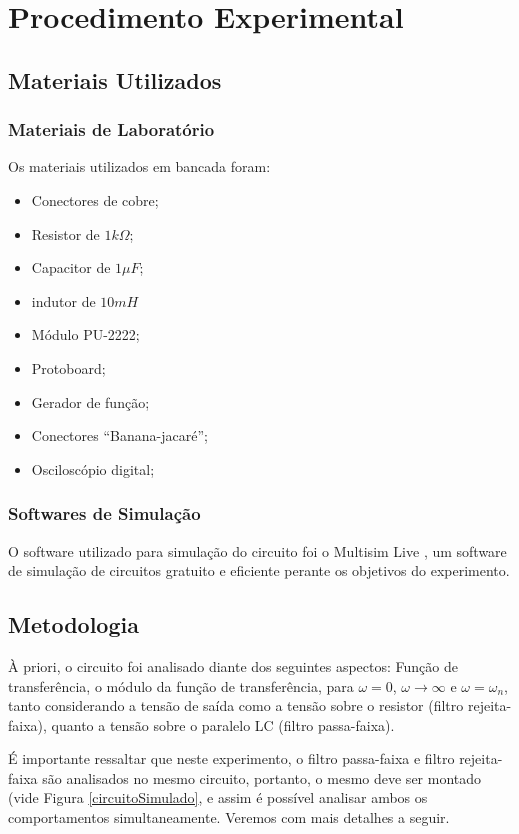 \newpage
\section{Procedimento Experimental}

\subsection{Materiais Utilizados}

\subsubsection{Materiais de Laboratório}
Os materiais utilizados em bancada foram:

\begin{itemize}
	\item Conectores de cobre;
	\item Resistor de $1 k\Omega$;
	\item Capacitor de $1 \mu F$;
	\item indutor de $10 mH$
	\item Módulo PU-2222;
	\item Protoboard;
	\item Gerador de função;
	\item Conectores “Banana-jacaré”;
	\item Osciloscópio digital;

\end{itemize}

\subsubsection{Softwares de Simulação}
O software utilizado para simulação do circuito foi o Multisim Live \cite{multisim}, um software de simulação de circuitos gratuito e eficiente perante os objetivos do experimento.

\subsection{Metodologia}
À priori, o circuito foi analisado diante dos seguintes aspectos: Função de transferência, o módulo da função de transferência, para $\omega=0$, $\omega\rightarrow\infty$ e $\omega=\omega_n$, tanto considerando a tensão de saída como a tensão sobre o resistor (filtro rejeita-faixa), quanto a tensão sobre o paralelo LC (filtro passa-faixa).

É importante ressaltar que neste experimento, o filtro passa-faixa e filtro rejeita-faixa são analisados no mesmo circuito, portanto, o mesmo deve ser montado (vide Figura \ref{circuitoSimulado}, e assim é possível analisar ambos os comportamentos simultaneamente. Veremos com mais detalhes a seguir.

